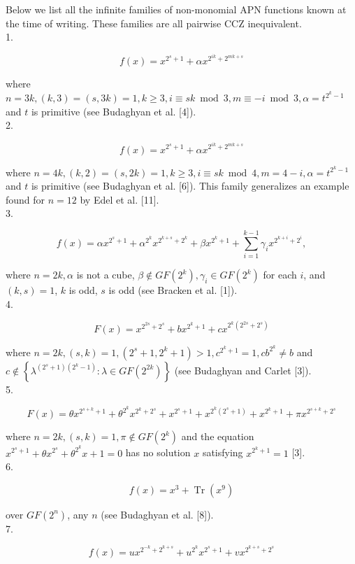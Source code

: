 \documentclass[10pt]{article}
\begin{document}
Below we list all the infinite families of non-monomial APN functions known at the time of writing. These families are all pairwise CCZ inequivalent.\\
1.

$$
f(x)=x^{2^{s}+1}+\alpha x^{2^{i k}+2^{m k+s}}
$$

where $n=3 k,(k, 3)=(s, 3 k)=1, k \geq 3, i \equiv s k \bmod 3, m \equiv-i \bmod 3, \alpha= t^{2^{k}-1}$ and $t$ is primitive (see Budaghyan et al. [4]).\\
2.

$$
f(x)=x^{2^{s}+1}+\alpha x^{2^{i k}+2^{m k+s}}
$$

where $n=4 k,(k, 2)=(s, 2 k)=1, k \geq 3, i \equiv s k \bmod 4, m=4-i, \alpha=t^{2^{k}-1}$ and $t$ is primitive (see Budaghyan et al. [6]). This family generalizes an example found for $n=12$ by Edel et al. [11].\\
3.

$$
f(x)=\alpha x^{2^{s}+1}+\alpha^{2^{k}} x^{2^{k+s}+2^{k}}+\beta x^{2^{k}+1}+\sum_{i=1}^{k-1} \gamma_{i} x^{2^{k+i}+2^{i}},
$$

where $n=2 k, \alpha$ is not a cube, $\beta \notin G F\left(2^{k}\right), \gamma_{i} \in G F\left(2^{k}\right)$ for each $i$, and $(k, s)=1$, $k$ is odd, $s$ is odd (see Bracken et al. [1]).\\
4.

$$
F(x)=x^{2^{2 s}+2^{s}}+b x^{2^{k}+1}+c x^{2^{k}\left(2^{2 s}+2^{s}\right)}
$$

where $n=2 k,(s, k)=1,\left(2^{s}+1,2^{k}+1\right)>1, c^{2^{k}+1}=1, c b^{2^{k}} \neq b$ and $c \notin \left\{\lambda^{\left(2^{s}+1\right)\left(2^{k}-1\right)}: \lambda \in G F\left(2^{2 k}\right)\right\}$ (see Budaghyan and Carlet [3]).\\
5.

$$
F(x)=\theta x^{2^{s+k}+1}+\theta^{2^{k}} x^{2^{k}+2^{s}}+x^{2^{s}+1}+x^{2^{k}\left(2^{s}+1\right)}+x^{2^{k}+1}+\pi x^{2^{s+k}+2^{s}}
$$

where $n=2 k,(s, k)=1, \pi \notin G F\left(2^{k}\right)$ and the equation $x^{2^{s}+1}+\theta x^{2^{s}}+\theta^{2^{k}} x+1=0$ has no solution $x$ satisfying $x^{2^{k}+1}=1$ [3].\\
6.

$$
f(x)=x^{3}+\operatorname{Tr}\left(x^{9}\right)
$$

over $G F\left(2^{n}\right)$, any $n$ (see Budaghyan et al. [8]).\\
7.

$$
f(x)=u x^{2^{-k}+2^{k+s}}+u^{2^{k}} x^{2^{s}+1}+v x^{2^{k+s}+2^{s}}
$$
\end{document}
